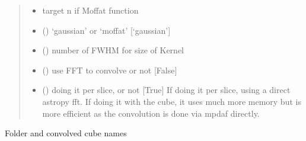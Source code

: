 \documentclass[letterpaper,10pt,english]{sphinxmanual}
\begin{document}
\begin{fulllineitems}
\begin{fulllineitems}
\begin{quote}
\begin{description}
\begin{itemize}
\item {} 
\sphinxAtStartPar
{} \textendash{} target n if Moffat function

\item {} 
\sphinxAtStartPar
{} () \textendash{} ‘gaussian’ or ‘moffat’ {[}‘gaussian’{]}

\item {} 
\sphinxAtStartPar
{} () \textendash{} number of FWHM for size of Kernel

\item {} 
\sphinxAtStartPar
{} () \textendash{} use FFT to convolve or not {[}False{]}

\item {} 
\sphinxAtStartPar
{} () \textendash{} doing it per slice, or not {[}True{]}
If doing it per slice, using a direct astropy fft. If
doing it with the cube, it uses much more memory but is
more efficient as the convolution is done via mpdaf directly.

\end{itemize}

\end{description}\end{quote}
\begin{description}
\sphinxAtStartPar
Folder and convolved cube names

\end{description}

\end{fulllineitems}



\end{fulllineitems}
\end{document}
